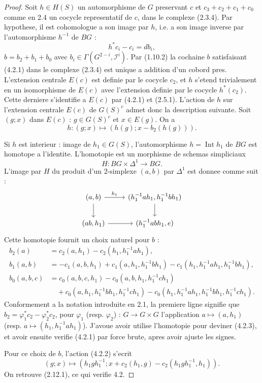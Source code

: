 \documentclass[11pt,a4paper]{article}
\theoremstyle{plain}
\theoremstyle{definition}
\DeclareMathOperator{\Int}{Int}
\begin{document}
\begin{proof}
Soit $h \in H(S)$ un automorphisme de $G$ preservant $c$ et $c_3 + c_2 + c_1 + c_0$ comme en 2.4 un cocycle representatif de $c$, dans le complexe (2.3.4). Par hypothese, il est cohomologue a son image par $h$, i.e. a son image inverse par l'automorphisme $h^{-1}$ de $BG$ :
\begin{equation}\label{4.2.1}
h^* c_i - c_i = db_i,
\end{equation}
$b = b_2 + b_1 + b_0$ avec $b_i \in \Gamma(G^{2-i}, \mathscr{I}^i)$. Par (1.10.2) la cochaine $b$ satisfaisant (4.2.1) dans le complexe (2.3.4) est unique a addition d'un cobord pres. L'extension centrale $E(c)$ est definie par le cocycle $c_2$, et $h$ s'etend trivialement en un isomorphisme de $E(c)$ avec l'extension definie par le cocycle $h^*(c_2)$. Cette derniere s'identifie a $E(c)$ par (4.2.1) et (2.5.1). L'action de $h$ sur l'extension centrale $E(c)$ de $G(S)^c$ admet donc la description suivante. Soit $(g; x)$ dans $E(c)$ : $g \in G(S)^c$ et $x \in E(g)$. On a
\begin{equation}\label{4.2.2}
h : (g; x) \mapsto (h(g); x - b_2(h(g))).
\end{equation}

Si $h$ est interieur : image de $h_1 \in G(S)$, l'automorphisme $h = \Int h_1$ de $BG$ est homotope a l'identite. L'homotopie est un morphisme de schemas simpliciaux
\[
H : BG \times \Delta^1 \to BG.
\]
L'image par $H$ du produit d'un 2-simplexe $(a, b)$ par $\Delta^1$ est donnee comme suit :
\[
\begin{tikzcd}
(a, b) \arrow{r}{h_1} \arrow{d} & (h_1^{-1} a h_1, h_1^{-1} b h_1) \arrow{d} \\
(ab, h_1) \arrow{r} & (h_1^{-1} ab h_1, e)
\end{tikzcd}
\]
Cette homotopie fournit un choix naturel pour $b$ :
\begin{equation}\label{4.2.3}
\begin{aligned}
b_2(a) &= c_2(a, h_1) - c_2(h_1, h_1^{-1} a h_1), \\
b_1(a, b) &= -c_1(a, b, h_1) + c_1(a, h_1, h_1^{-1} b h_1) - c_1(h_1, h_1^{-1} a h_1, h_1^{-1} b h_1), \\
b_0(a, b, c) &= c_0(a, b, c, h_1) - c_0(a, b, h_1, h_1^{-1} c h_1) \\
&\quad + c_0(a, h_1, h_1^{-1} b h_1, h_1^{-1} c h_1) - c_0(h_1, h_1^{-1} a h_1, h_1^{-1} b h_1, h_1^{-1} c h_1).
\end{aligned}
\end{equation}
Conformement a la notation introduite en 2.1, la premiere ligne signifie que $b_2 = \varphi_1^* c_2 - \varphi_2^* c_2$, pour $\varphi_1$ (resp. $\varphi_2$) : $G \to G \times G$ l'application $a \mapsto (a, h_1)$ (resp. $a \mapsto (h_1, h_1^{-1} a h_1)$). J'avoue avoir utilise l'homotopie pour deviner (4.2.3), et avoir ensuite verifie (4.2.1) par force brute, apres avoir ajuste les signes.

Pour ce choix de $b$, l'action (4.2.2) s'ecrit
\begin{equation}\label{4.2.4}
(g; x) \mapsto (h_1 g h_1^{-1}; x + c_2(h_1, g) - c_2(h_1 g h_1^{-1}, h_1)).
\end{equation}
On retrouve (2.12.1), ce qui verifie 4.2.
\end{proof}
\end{document}
